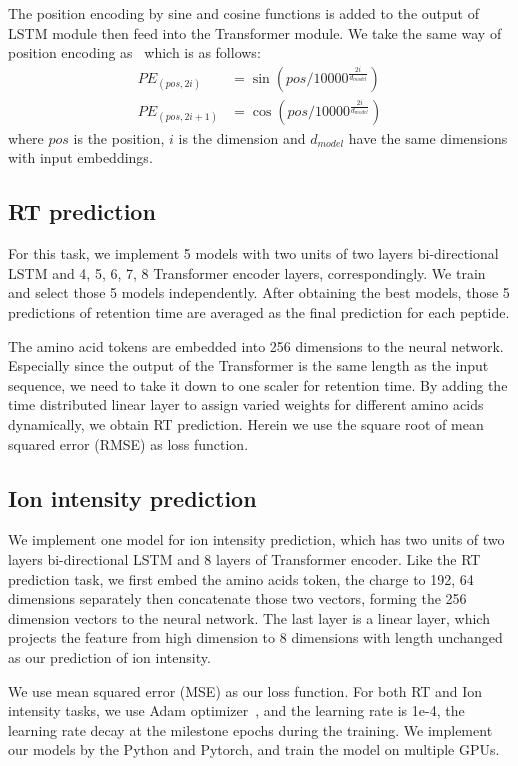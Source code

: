 The position encoding by sine and cosine functions is added to the output of LSTM module then feed into the Transformer module.
We take the same way of position encoding as~\cite{vaswani2017attention} which is as follows:
\begin{align*}
    PE_{(pos, 2i)} &= \sin{(pos/10000^{\frac{2i}{d_{model}}})} \\
    PE_{(pos, 2i+1)} &= \cos{(pos/10000^{\frac{2i}{d_{model}}})}
\end{align*}
where $pos$  is the position, $i$ is the dimension and $d_{model}$ have the same dimensions with input embeddings.

\subsection{RT prediction}

For this task, we implement
5 models with two units of two layers bi-directional LSTM and 4, 5, 6, 7, 8 Transformer encoder layers, correspondingly. We train and select those 5 models independently. After obtaining the best models, those 5 predictions of retention time are averaged as the final prediction for each peptide.

The amino acid tokens are embedded into 256 dimensions to the neural network.
Especially since the output of the Transformer is the same length as the input sequence, we need to take it down to one scaler for retention time. By adding the time distributed linear layer to assign varied weights for different amino acids dynamically, we obtain RT prediction.
Herein we use the square root of mean squared error (RMSE) as loss function.

\subsection{Ion intensity prediction}

We implement one model for ion intensity prediction, which has two units of two layers bi-directional LSTM and 8 layers of Transformer encoder. Like the RT prediction task, we first embed the amino acids token, the charge to 192, 64 dimensions separately then concatenate those two vectors, forming the 256 dimension vectors to the neural network. The last layer is a linear layer, which projects the feature from high dimension to 8 dimensions with length unchanged as our prediction of ion intensity.

We use mean squared
error (MSE) as our loss function. For both RT and Ion intensity tasks, we use Adam optimizer~\cite{kingma2017adam}, and the learning rate is 1e-4, the learning rate decay at the milestone epochs during the training. We implement our models by the Python and Pytorch, and train the model on multiple GPUs. 


